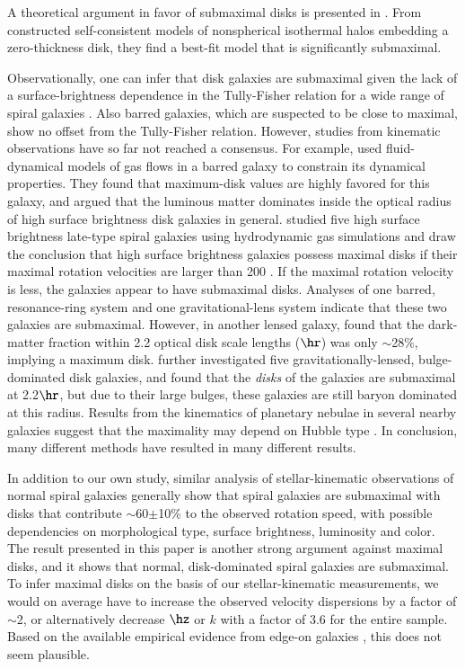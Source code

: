\documentclass[traditabstract]{aa} %
\begin{document}
A theoretical argument in favor of submaximal disks is presented in \cite{amorisco2010}. 
From constructed self-consistent models of nonspherical isothermal halos embedding a 
zero-thickness disk, they find a best-fit model that is significantly submaximal.

Observationally, one can infer that disk galaxies are submaximal given the lack of a
surface-brightness dependence in the Tully-Fisher relation for a wide range of spiral
galaxies \citep{zwaan1995,courteau1999,courteau2003}. Also barred galaxies, which are
suspected to be close to maximal, show no offset from the Tully-Fisher relation.
%
However, studies from kinematic observations have so far not reached a consensus. For 
example, \cite{weiner2001} used fluid-dynamical models of gas flows in a barred galaxy to
constrain its dynamical properties. They found that maximum-disk values are highly favored
for this galaxy, and argued that the luminous matter dominates inside the optical radius
of high surface brightness disk galaxies in general.
%
\cite{kranz2003} studied five high surface brightness late-type spiral galaxies using
hydrodynamic gas simulations and draw the conclusion that high surface brightness galaxies
possess maximal disks if their maximal rotation velocities are larger than 200 \kms.
If the maximal rotation velocity is less, the galaxies appear to have submaximal disks.
%
Analyses of one barred, resonance-ring system \citep{byrd2006} and one gravitational-lens
system \citep{dutton2011} indicate that these two galaxies are submaximal. However, in
another lensed galaxy, \cite{barnabe2012} found that the dark-matter fraction within
2.2 optical disk scale lengths ($\hr$) was only $\sim$28\%, implying a maximum disk.
\cite{dutton2013} further investigated five gravitationally-lensed, bulge-dominated disk
galaxies, and found that the {\it disks} of the galaxies are submaximal at 2.2$\hr$, but
due to their large bulges, these galaxies are still baryon dominated at this radius. 
Results from the kinematics of planetary nebulae in several nearby galaxies suggest
that the maximality may depend on Hubble type \citep{herrmann2009}. In conclusion, many
different methods have resulted in many different results.

In addition to our own study, similar analysis of stellar-kinematic observations of normal
spiral galaxies \citep[e.g.,][]{bottema1993, kregel2005, herrmann2009} generally show that
spiral galaxies are submaximal with disks that contribute $\sim$60$\pm$10\% to the
observed rotation speed, with possible dependencies on morphological type, surface
brightness, luminosity and color.
%
The result presented in this paper is another strong argument against maximal disks, and
it shows that normal, disk-dominated spiral galaxies are submaximal. To infer maximal
disks on the basis of our stellar-kinematic measurements, we would on average have to
increase the observed velocity dispersions by a factor of $\sim$2, or alternatively
decrease $\hz$ or $k$ with a factor of 3.6 for the entire sample. Based on the available
empirical evidence from edge-on galaxies \citep[e.g.,][]{kregel2002}, this does not seem
plausible.
\end{document}

